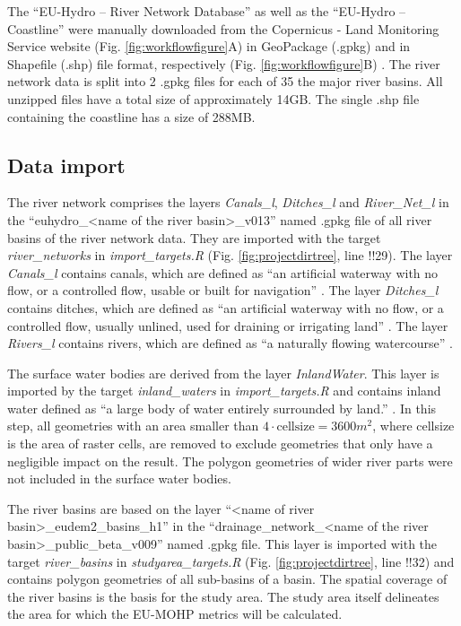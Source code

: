\documentclass[fleqn,10pt]{wlscirep}
\begin{document}
The ``EU-Hydro -- River Network Database'' as well as the ``EU-Hydro -- Coastline'' were manually downloaded from the Copernicus - Land Monitoring Service website (Fig. \ref{fig:workflowfigure}A) in GeoPackage (.gpkg) and in Shapefile (.shp) file format, respectively (Fig. \ref{fig:workflowfigure}B) \cite{noauthor_eu-hydro_2021, noauthor_eu-hydro_2021}. The river network data is split into 2 .gpkg files for each of 35 the major river basins. All unzipped files have a total size of approximately 14GB. The single .shp file containing the coastline has a size of 288MB.

\hypertarget{data-import}{%
\subsection*{Data import}\label{data-import}}

The river network comprises the layers \emph{Canals\_l}, \emph{Ditches\_l} and \emph{River\_Net\_l} in the ``euhydro\_\textless name of the river basin\textgreater\_v013'' named .gpkg file of all river basins of the river network data. They are imported with the target \emph{river\_networks} in \emph{import\_targets.R} (Fig. \ref{fig:projectdirtree}, line !!29). The layer \emph{Canals\_l} contains canals, which are defined as ``an artificial waterway with no flow, or a controlled flow, usable or built for navigation'' \cite{gallaun_eu-hydro_2019}. The layer \emph{Ditches\_l} contains ditches, which are defined as ``an artificial waterway with no flow, or a controlled flow, usually unlined, used for draining or irrigating land'' \cite{gallaun_eu-hydro_2019}. The layer \emph{Rivers\_l} contains rivers, which are defined as ``a naturally flowing watercourse'' \cite{gallaun_eu-hydro_2019}.

The surface water bodies are derived from the layer \emph{InlandWater}. This layer is imported by the target \emph{inland\_waters} in \emph{import\_targets.R} and contains inland water defined as ``a large body of water entirely surrounded by land.'' \cite{gallaun_eu-hydro_2019}. In this step, all geometries with an area smaller than \(4 \cdot \text{cellsize} = 3600m^2\), where cellsize is the area of raster cells, are removed to exclude geometries that only have a negligible impact on the result. The polygon geometries of wider river parts were not included in the surface water bodies.

The river basins are based on the layer ``\textless name of river basin\textgreater\_eudem2\_basins\_h1'' in the ``drainage\_network\_\textless name of the river basin\textgreater\_public\_beta\_v009'' named .gpkg file. This layer is imported with the target \emph{river\_basins} in \emph{studyarea\_targets.R} (Fig. \ref{fig:projectdirtree}, line !!32) and contains polygon geometries of all sub-basins of a basin. The spatial coverage of the river basins is the basis for the study area. The study area itself delineates the area for which the EU-MOHP metrics will be calculated.
\end{document}
